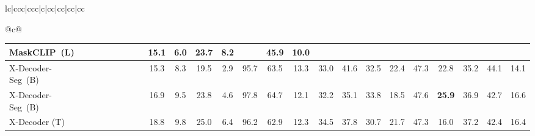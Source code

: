 \documentclass[10pt,twocolumn,letterpaper]{article}
\begin{document}
\begin{table*}[!ht]
{\begin{tabular}{lc|ccc|ccc|c|cc|cc|cc|cc}
{\begin{tabular}[c]{@{}c@{}}
\begin{table*}
{\begin{tabular}{lccccccc|cccccccccccccccc}
MaskCLIP~(L)~\cite{ding2022open}                                           & \cmark & \cmark   & \xmark                    & \xmark                    & \cmark                    & \cmark                   & \xmark                                                                  & 15.1                                     & 6.0                                      & 23.7          & 8.2                                     &                                         & 45.9          & 10.0          &              &              &              &              &              &                                         &                                         &              &               \\ 
\hline
X-Decoder-Seg~(B)                                      & \cmark & \cmark   & \xmark                    & \xmark                    & \xmark                    & \xmark                   & \xmark                                                                  & 15.3                                     & 8.3                                      & 19.5          & 2.9                                     & 95.7                                     & 63.5          & 13.3          & 33.0          & 41.6          & 32.5          & 22.4          & 47.3          & 22.8                                     & 35.2                                     & 44.1          & 14.1           \\
X-Decoder-Seg~(B)                                  & \cmark & \cmark   & \cmark                    & \xmark                    & \xmark                    & \xmark                   & \xmark                                                                  & 16.9                                     & 9.5                                      & 23.8          & 4.6                                     & 97.8                                     & 64.7          & 12.1          & 32.2          & 35.1          & 33.8          & 18.5          & 47.6          & \textbf{25.9}                            & 36.9                                     & 42.7          & 16.6           \\ 
\hline
\rowcolor[rgb]{0.937,0.937,0.937} X-Decoder (T)        & \cmark & \cmark   & \cmark                    & \cmark                    & \xmark                    & \xmark                   & \xmark                                                                  & 18.8                                     & 9.8                                      & 25.0          & 6.4                                     & 96.2                                     & 62.9          & 12.3          & 34.5          & 37.8          & 30.7          & 21.7          & 47.3          & 16.0                                     & 37.2                                     & 42.4          & 16.4           \\

\end{tabular}}
\end{table*}
\end{tabular}}
\end{tabular}}
\end{table*}
\end{document}
